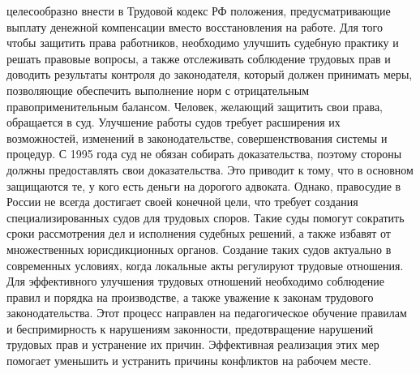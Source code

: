 целесообразно внести в Трудовой кодекс РФ положения, предусматривающие выплату денежной компенсации вместо восстановления на работе. Для того чтобы защитить права работников, необходимо улучшить судебную практику и решать правовые вопросы, а также отслеживать соблюдение трудовых прав и доводить результаты контроля до законодателя, который должен принимать меры, позволяющие обеспечить выполнение норм с отрицательным правоприменительным балансом. Человек, желающий защитить свои права, обращается в суд. Улучшение работы судов требует расширения их возможностей, изменений в законодательстве, совершенствования системы и процедур. С 1995 года суд не обязан собирать доказательства, поэтому стороны должны предоставлять свои доказательства. Это приводит к тому, что в основном защищаются те, у кого есть деньги на дорогого адвоката. Однако, правосудие в России не всегда достигает своей конечной цели, что требует создания специализированных судов для трудовых споров. Такие суды помогут сократить сроки рассмотрения дел и исполнения судебных решений, а также избавят от множественных юрисдикционных органов. Создание таких судов актуально в современных условиях, когда локальные акты регулируют трудовые отношения. Для эффективного улучшения трудовых отношений необходимо соблюдение правил и порядка на производстве, а также уважение к законам трудового законодательства. Этот процесс направлен на педагогическое обучение правилам и беспримирность к нарушениям законности, предотвращение нарушений трудовых прав и устранение их причин. Эффективная реализация этих мер помогает уменьшить и устранить причины конфликтов на рабочем месте.

